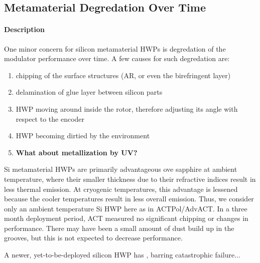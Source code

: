 \subsection{Metamaterial Degredation Over Time}

\paragraph{Description} 

One minor concern for silicon metamaterial HWPs is degredation of the modulator performance over time.  A few causes for such degredation are:

\begin{enumerate}
	\item chipping of the surface structures (AR, or even the birefringent layer)
	\item delamination of glue layer between silicon parts
	\item HWP moving around inside the rotor, therefore adjusting its angle with respect to the encoder
	\item HWP becoming dirtied by the environment
	\item \textbf{What about metallization by UV?}
\end{enumerate}

Si metamaterial HWPs are primarily advantageous ove sapphire at ambient temperature, where their smaller thickness due to their refractive indices result in less thermal emission. At cryogenic temperatures, this advantage is lessened because the cooler temperatures result in less overall emission. Thus, we consider only an ambient temperature Si HWP here as in ACTPol/AdvACT. In a three month deployment period, ACT measured no significant chipping or changes in performance.  There may have been a small amount of dust build up in the grooves, but this is not expected to decrease performance.

A newer, yet-to-be-deployed silicon HWP has , barring catastrophic failure...
  
